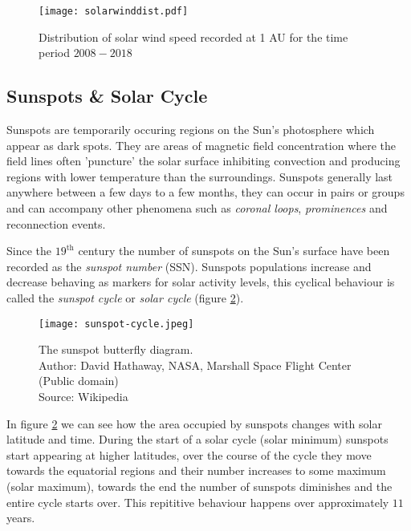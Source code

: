 \begin{figure}
    \noindent\centering\texttt{[image: solarwinddist.pdf]}
    \caption{
        \small{Distribution of solar wind speed recorded at 1 AU for the time period $2008 - 2018$}}
    \label{fig:solarwinddist}
\end{figure}



\subsection{Sunspots \& Solar Cycle}\label{sec:sunspots}

Sunspots are temporarily occuring regions on the Sun's photosphere which appear as dark spots. They are areas 
of magnetic field concentration where the field lines often 'puncture' the solar surface inhibiting convection 
and producing regions with lower temperature than the surroundings. Sunspots generally last anywhere between a 
few days to a few months, they can occur in pairs or groups and can accompany other phenomena such as 
\emph{coronal loops}, \emph{prominences} and reconnection events.

Since the $19^{\text{th}}$ century the number of sunspots on the Sun's surface have been recorded as the 
\emph{sunspot number} (SSN). Sunspots populations increase and decrease behaving as markers for solar activity levels, 
this cyclical behaviour is called the \emph{sunspot cycle} or \emph{solar cycle} (figure \ref{fig:SolarCycle}). 

\begin{figure}
    \noindent\texttt{[image: sunspot-cycle.jpeg]}
    \caption{\small{The sunspot butterfly diagram.  \\ 
    Author: David Hathaway, NASA, Marshall Space Flight Center (Public domain) \\ 
    Source: Wikipedia}}
    \label{fig:SolarCycle}
\end{figure}

In figure \ref{fig:SolarCycle} we can see how the area occupied by sunspots changes with solar latitude and time. 
During the start of a solar cycle (solar minimum) sunspots start appearing at higher latitudes, over the course 
of the cycle they move towards the equatorial regions and their number increases to some maximum (solar maximum), 
towards the end the number of sunspots diminishes and the entire cycle starts over. This repititive behaviour 
happens over approximately $11$ years.

